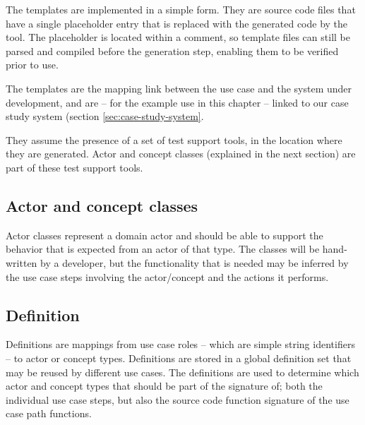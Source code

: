 \noindent The templates are implemented in a simple form. They are source code files that have a single placeholder entry that is replaced with the generated code by the tool. The placeholder is located within a comment, so template files can still be parsed and compiled before the generation step, enabling them to be verified prior to use.\medskip

\noindent The templates are the mapping link between the use case and the system under development, and are -- for the example use in this chapter -- linked to our case study system (section \ref{sec:case-study-system}.\medskip

\noindent They assume the presence of a set of test support tools, in the location where they are generated. Actor and concept classes (explained in the next section) are part of these test support tools.

\subsection{Actor and concept classes}
Actor classes represent a domain actor and should be able to support the behavior that is expected from an actor of that type. The classes will be hand-written by a developer, but the functionality that is needed may be inferred by the use case steps involving the actor/concept and the actions it performs.

\subsection{Definition}
Definitions are mappings from use case roles -- which are simple string identifiers -- to actor or concept types. Definitions are stored in a global definition set that may be reused by different use cases. The definitions are used to determine which actor and concept types that should be part of the signature of; both the individual use case steps, but also the source code function signature of the use case path functions.

